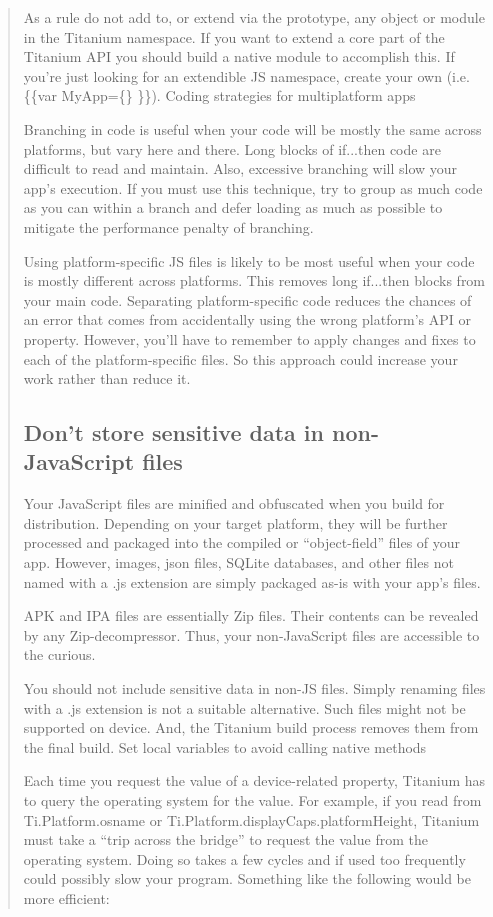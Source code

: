 \documentclass[11pt]{book}
\begin{document}
\begin{quotation}
As a rule do not add to, or extend via the prototype, any object or module in the Titanium namespace. If you want to extend a core part of the Titanium API you should build a native module to accomplish this. If you're just looking for an extendible JS namespace, create your own (i.e. \{\{var MyApp=\{\} \}\}).
Coding strategies for multiplatform apps

Branching in code is useful when your code will be mostly the same across platforms, but vary here and there. Long blocks of if...then code are difficult to read and maintain. Also, excessive branching will slow your app's execution. If you must use this technique, try to group as much code as you can within a branch and defer loading as much as possible to mitigate the performance penalty of branching.

Using platform-specific JS files is likely to be most useful when your code is mostly different across platforms. This removes long if...then blocks from your main code. Separating platform-specific code reduces the chances of an error that comes from accidentally using the wrong platform's API or property. However, you'll have to remember to apply changes and fixes to each of the platform-specific files. So this approach could increase your work rather than reduce it. 

\subsection{Don't store sensitive data in non-JavaScript files}
Your JavaScript files are minified and obfuscated when you build for distribution. Depending on your target platform, they will be further processed and packaged into the compiled or ``object-field'' files of your app. However, images, \gls{json} files, SQLite databases, and other files not named with a .js extension are simply packaged as-is with your app's files.

APK and IPA files are essentially Zip files. Their contents can be revealed by any Zip-decompressor. Thus, your non-JavaScript files are accessible to the curious.

You should not include sensitive data in non-JS files. Simply renaming files with a .js extension is not a suitable alternative. Such files might not be supported on device. And, the Titanium build process removes them from the final build.
Set local variables to avoid calling native methods

Each time you request the value of a device-related property, Titanium has to query the operating system for the value. For example, if you read from Ti.Platform.osname or Ti.Platform.displayCaps.platformHeight, Titanium must take a ``trip across the bridge'' to request the value from the operating system. Doing so takes a few cycles and if used too frequently could possibly slow your program. Something like the following would be more efficient: %


\end{quotation}
\end{document}
